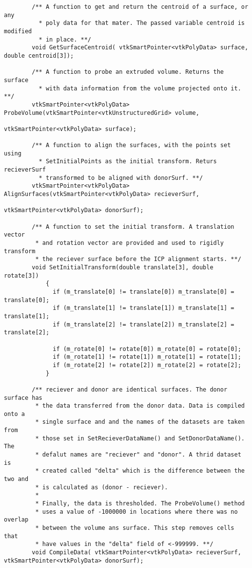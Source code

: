 \begin{lstlisting}
        /** A function to get and return the centroid of a surface, or any
          * poly data for that mater. The passed variable centroid is modified
          * in place. **/
        void GetSurfaceCentroid( vtkSmartPointer<vtkPolyData> surface, double centroid[3]);

        /** A function to probe an extruded volume. Returns the surface
          * with data information from the volume projected onto it. **/
        vtkSmartPointer<vtkPolyData> ProbeVolume(vtkSmartPointer<vtkUnstructuredGrid> volume,
                                                 vtkSmartPointer<vtkPolyData> surface);

        /** A function to align the surfaces, with the points set using
          * SetInitialPoints as the initial transform. Returs recieverSurf
          * transformed to be aligned with donorSurf. **/
        vtkSmartPointer<vtkPolyData> AlignSurfaces(vtkSmartPointer<vtkPolyData> recieverSurf,
                                                   vtkSmartPointer<vtkPolyData> donorSurf);

        /** A function to set the initial transform. A translation vector
         * and rotation vector are provided and used to rigidly transform
         * the reciever surface before the ICP alignment starts. **/
        void SetInitialTransform(double translate[3], double rotate[3])
            {
              if (m_translate[0] != translate[0]) m_translate[0] = translate[0];
              if (m_translate[1] != translate[1]) m_translate[1] = translate[1];
              if (m_translate[2] != translate[2]) m_translate[2] = translate[2];

              if (m_rotate[0] != rotate[0]) m_rotate[0] = rotate[0];
              if (m_rotate[1] != rotate[1]) m_rotate[1] = rotate[1];
              if (m_rotate[2] != rotate[2]) m_rotate[2] = rotate[2];
            }

        /** reciever and donor are identical surfaces. The donor surface has
         * the data transferred from the donor data. Data is compiled onto a
         * single surface and and the names of the datasets are taken from
         * those set in SetRecieverDataName() and SetDonorDataName(). The
         * defalut names are "reciever" and "donor". A thrid dataset is
         * created called "delta" which is the difference between the two and
         * is calculated as (donor - reciever).
         *
         * Finally, the data is thresholded. The ProbeVolume() method
         * uses a value of -1000000 in locations where there was no overlap
         * between the volume ans surface. This step removes cells that
         * have values in the "delta" field of <-999999. **/
        void CompileData( vtkSmartPointer<vtkPolyData> recieverSurf, vtkSmartPointer<vtkPolyData> donorSurf);


\end{lstlisting}
